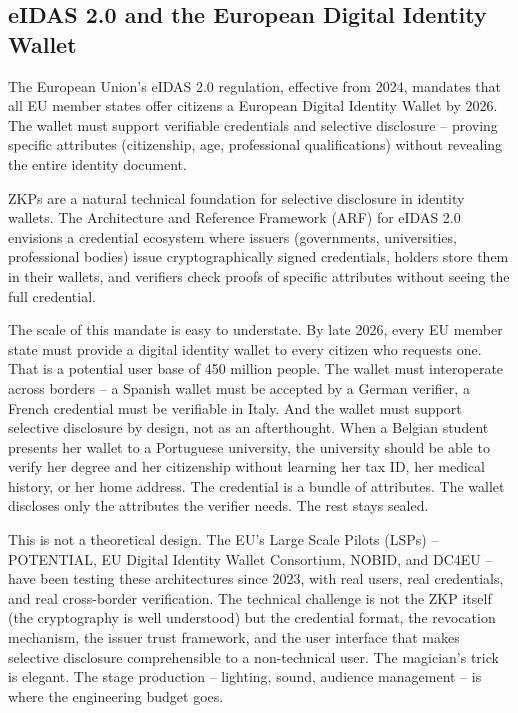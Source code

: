 \documentclass[
  11pt,
  openany]{report}
\begin{document}
\subsection{eIDAS 2.0 and the European Digital Identity
Wallet}\label{eidas-2.0-and-the-european-digital-identity-wallet}

The European Union's eIDAS 2.0 regulation, effective from 2024, mandates that
all EU member states offer citizens a European Digital Identity Wallet by 2026.
The wallet must support verifiable credentials and selective disclosure --
proving specific attributes (citizenship, age, professional qualifications)
without revealing the entire identity document.

ZKPs are a natural technical foundation for selective disclosure in identity
wallets. The Architecture and Reference Framework (ARF) for eIDAS 2.0 envisions
a credential ecosystem where issuers (governments, universities, professional
bodies) issue cryptographically signed credentials, holders store them in their
wallets, and verifiers check proofs of specific attributes without seeing the
full credential.

The scale of this mandate is easy to understate. By late 2026, every EU member
state must provide a digital identity wallet to every citizen who requests one.
That is a potential user base of 450 million people. The wallet must
interoperate across borders -- a Spanish wallet must be accepted by a German
verifier, a French credential must be verifiable in Italy. And the wallet must
support selective disclosure by design, not as an afterthought. When a Belgian
student presents her wallet to a Portuguese university, the university should be
able to verify her degree and her citizenship without learning her tax ID, her
medical history, or her home address. The credential is a bundle of attributes.
The wallet discloses only the attributes the verifier needs. The rest stays
sealed.

This is not a theoretical design. The EU's Large Scale Pilots (LSPs) --
POTENTIAL, EU Digital Identity Wallet Consortium, NOBID, and DC4EU -- have been
testing these architectures since 2023, with real users, real credentials, and
real cross-border verification. The technical challenge is not the ZKP itself
(the cryptography is well understood) but the credential format, the revocation
mechanism, the issuer trust framework, and the user interface that makes
selective disclosure comprehensible to a non-technical user. The magician's
trick is elegant. The stage production -- lighting, sound, audience management
-- is where the engineering budget goes.
\end{document}
